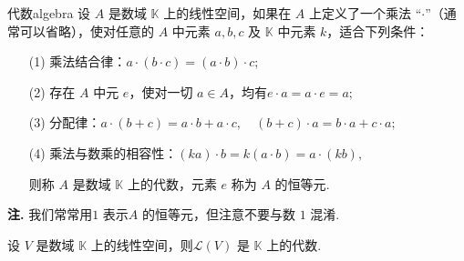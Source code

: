 \documentclass[12pt, a4paper,newtx]{ctexart}
\newenvironment{remark}{\dbend\textbf{注. }}{}{}
\begin{document}
\begin{definition}{代数}{algebra}\kaishu 
	设 $A$ 是数域 $\mathbb{K}$ 上的线性空间，如果在 $A$ 上定义了一个乘法 “$\cdot$”（通常可以省略），使对任意的 $A$ 中元素 $a, b, c$ 及 $\mathbb{K}$ 中元素 $k$，适合下列条件：
	\begin{enumerate}
		\item[(1)] 乘法结合律：$a \cdot (b \cdot c) = (a \cdot b) \cdot c$;
		\item[(2)] 存在 $A$ 中元 $e$，使对一切 $a \in A$，均有$
		e \cdot a = a \cdot e = a;$
		\item[(3)] 分配律：$
		a \cdot (b + c) = a \cdot b + a \cdot c,\quad
		(b + c) \cdot a = b \cdot a + c \cdot a;$
		\item[(4)] 乘法与数乘的相容性：$(ka) \cdot b = k(a \cdot b) = a \cdot (kb),$
		
		则称 $A$ 是数域 $\mathbb{K}$ 上的{\heiti 代数}，元素 $e$ 称为 $A$ 的{\heiti 恒等元}. 
	\end{enumerate}
\end{definition}
\begin{remark}
	我们常常用$1$ 表示$A$ 的恒等元，但注意不要与数 $1$ 混淆. 
\end{remark}
\begin{theorem}{}{}
	设 $V$ 是数域 $\mathbb{K}$ 上的线性空间，则$\mathcal{L}(V)$ 是 $\mathbb{K}$ 上的代数. 
\end{theorem}
\end{document}
